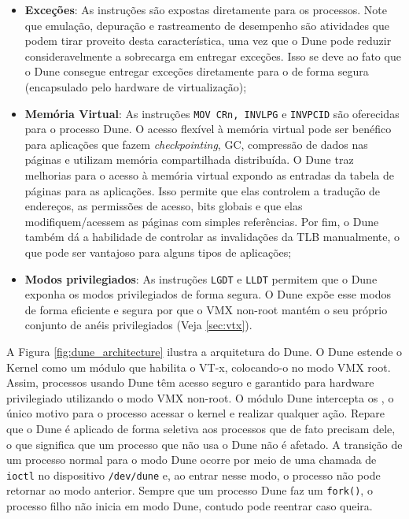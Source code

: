 \begin{itemize}
	\item \textbf{Exceções}:  As instruções  são
        expostas diretamente para os processos. Note que emulação, depuração e
        rastreamento de desempenho são atividades que podem tirar proveito
        desta característica, uma vez que o Dune pode reduzir consideravelmente
        a sobrecarga em entregar exceções. Isso se deve ao fato que o Dune
        consegue entregar exceções diretamente para o  de forma segura
        (encapsulado pelo hardware de virtualização);
  \item \textbf{Memória Virtual}: As instruções \texttt{MOV CRn, INVLPG} e
        \texttt{INVPCID} são oferecidas para o processo Dune. O acesso
        flexível à memória virtual pode ser benéfico para aplicações que fazem
        \emph{checkpointing}, GC, compressão de dados nas páginas e utilizam memória
        compartilhada distribuída. O Dune traz melhorias para o acesso à
        memória virtual expondo as entradas da tabela de páginas para as
        aplicações. Isso permite que elas controlem a tradução de endereços,
        as permissões de acesso, bits globais e que elas modifiquem/acessem as páginas com
        simples referências. Por fim, o Dune também dá a habilidade de
        controlar as invalidações da TLB manualmente, o que pode ser vantajoso
        para alguns tipos de aplicações;
  \item \textbf{Modos privilegiados}: As instruções \texttt{LGDT} e
        \texttt{LLDT} permitem que o Dune exponha os modos privilegiados de
        forma segura. O Dune expõe esse modos de forma eficiente e segura por
        que o VMX non-root mantém o seu próprio conjunto de anéis privilegiados
        (Veja \ref{sec:vtx}).
\end{itemize}

A Figura \ref{fig:dune_architecture} ilustra a arquitetura do Dune. O Dune
estende o Kernel como um módulo que habilita o VT-x, colocando-o no
modo VMX root. Assim, processos usando Dune têm acesso seguro e garantido para
hardware privilegiado utilizando o modo VMX non-root. O módulo Dune intercepta
os , o único motivo para o processo acessar o kernel e realizar
qualquer ação. Repare que o Dune é aplicado de forma seletiva aos processos que
de fato precisam dele, o que significa que um processo que não usa o Dune não é
afetado. A transição de um processo normal para o modo Dune ocorre por meio de
uma chamada de \texttt{ioctl} no dispositivo \texttt{/dev/dune} e, ao
entrar nesse modo, o processo não pode retornar ao modo anterior. Sempre que um
processo Dune faz um \texttt{fork()}, o processo filho não inicia em modo Dune,
contudo pode reentrar caso queira.

